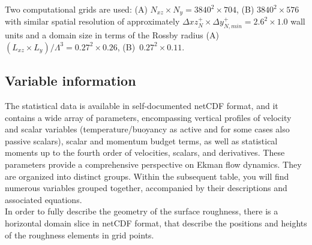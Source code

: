 \documentclass[11pt]{article}
\begin{document}
%
Two computational grids are used: (A) $N_{xz}\times N_y=3840^2\times704$, (B) $3840^2\times576$ with similar spatial resolution of approximately $\Delta xz_{N}^+\times\Delta y_{N,min}^+=2.6^2\times1.0$ wall units and a domain size in terms of the Rossby radius (A)~$(L_{xz}\times L_y)/\Lambda^3=0.27^2\times0.26$, (B)~$0.27^2\times0.11$. 
%
\subsection{Variable information} 
The statistical data is available in self-documented netCDF format, and it contains a wide array of parameters, encompassing vertical profiles of velocity and scalar variables (temperature/buoyancy as active and for some cases also passive scalars), scalar and momentum budget terms, as well as statistical moments up to the fourth order of velocities, scalars, and derivatives. These parameters provide a comprehensive perspective on Ekman flow dynamics. They are organized into distinct groups. Within the subsequent table, you will find numerous variables grouped together, accompanied by their descriptions and associated equations. \\
In order to fully describe the geometry of the surface roughness, there is a horizontal domain slice in netCDF format, that describe the positions and heights of the roughness elements in grid points.
\par
\end{document}
